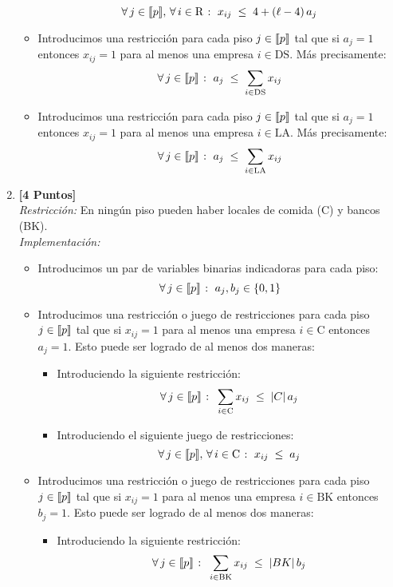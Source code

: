 \documentclass[ a4paper, twoside, 11pt]{article}
\begin{document}
\begin{problem}
\begin{enumerate}[label=\textbf{\alph*)}]
\begin{itemize}
\[
\forall \, j \in \llbracket p \rrbracket, \, \forall \, i \in \text{R} \; \colon \;
x_{ij} \; \leq \; 4 + (\ell - 4) \, a_j
\]
\item Introducimos una restricci\'on para cada piso $j \in \llbracket p \rrbracket$ tal que si $a_j = 1$ entonces $x_{ij} = 1$ para al menos una empresa $i \in \text{DS}$. M\'as precisamente: 
\[
\forall \, j \in \llbracket p \rrbracket \; \colon \;
a_j \; \leq \; \sum_{i \in \text{DS}} x_{ij}
\]
\item Introducimos una restricci\'on para cada piso $j \in \llbracket p \rrbracket$ tal que si $a_j = 1$ entonces $x_{ij} = 1$ para al menos una empresa $i \in \text{LA}$. M\'as precisamente: 
\[
\forall \, j \in \llbracket p \rrbracket \; \colon \;
a_j \; \leq \; \sum_{i \in \text{LA}} x_{ij}
\]
\end{itemize}
\item \textbf{[4 Puntos]} \\[1ex]
\emph{Restricci\'on:} En ning\'un piso pueden haber locales de comida (C) y bancos (BK). \\[1ex]
\emph{Implementaci\'on:}
\begin{itemize}
\item Introducimos un par de variables binarias indicadoras para cada piso: 
\[
\forall \, j \in \llbracket p \rrbracket \; \colon \; a_j, b_j \in \{ 0, 1 \}
\]
\item Introducimos una restricci\'on o juego de restricciones para cada piso $j \in \llbracket p \rrbracket$ tal que si $x_{ij} = 1$ para al menos una empresa $i \in \text{C}$ entonces $a_j = 1$. Esto puede ser logrado de al menos dos maneras: 
\begin{itemize}
\item Introduciendo la siguiente restricci\'on: 
\[
\forall \, j \in \llbracket p \rrbracket \; \colon \;
\sum_{i \in \text{C}} x_{ij} \; \leq \; |C| \, a_j
\]
\item Introduciendo el siguiente juego de restricciones: 
\[
\forall \, j \in \llbracket p \rrbracket, \, \forall \, i \in \text{C} \; \colon \;
x_{ij} \; \leq \; a_j
\]
\end{itemize}
\item Introducimos una restricci\'on o juego de restricciones para cada piso $j \in \llbracket p \rrbracket$ tal que si $x_{ij} = 1$ para al menos una empresa $i \in \text{BK}$ entonces $b_j = 1$. Esto puede ser logrado de al menos dos maneras: 
\begin{itemize}
\item Introduciendo la siguiente restricci\'on: 
\[
\forall \, j \in \llbracket p \rrbracket \; \colon \;
\sum_{i \in \text{BK}} x_{ij} \; \leq \; |BK| \, b_j
\]
\end{itemize}
\end{itemize}
\end{enumerate}
\end{problem}
\end{document}
